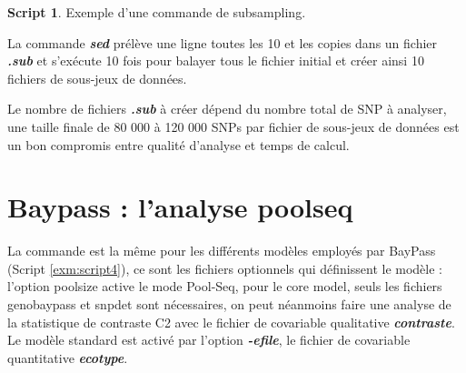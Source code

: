 \documentclass[
  openany]{book}
\newenvironment{Shaded}{\begin{snugshade}}{\end{snugshade}}
\newcommand{\AttributeTok}[1]{\textcolor[rgb]{0.13,0.29,0.53}{#1}}
\newcommand{\ControlFlowTok}[1]{\textcolor[rgb]{0.13,0.29,0.53}{\textbf{#1}}}
\newcommand{\DataTypeTok}[1]{\textcolor[rgb]{0.13,0.29,0.53}{#1}}
\newcommand{\DecValTok}[1]{\textcolor[rgb]{0.00,0.00,0.81}{#1}}
\newcommand{\FunctionTok}[1]{\textcolor[rgb]{0.13,0.29,0.53}{\textbf{#1}}}
\newcommand{\KeywordTok}[1]{\textcolor[rgb]{0.13,0.29,0.53}{\textbf{#1}}}
\newcommand{\NormalTok}[1]{#1}
\newcommand{\OperatorTok}[1]{\textcolor[rgb]{0.81,0.36,0.00}{\textbf{#1}}}
\newcommand{\StringTok}[1]{\textcolor[rgb]{0.31,0.60,0.02}{#1}}
\newcommand{\VariableTok}[1]{\textcolor[rgb]{0.00,0.00,0.00}{#1}}
\theoremstyle{definition}
\theoremstyle{definition}
\newtheorem{example}{Script}[chapter]
\theoremstyle{definition}
\theoremstyle{definition}
\theoremstyle{remark}
\begin{document}
\begin{example}
\protect\hypertarget{exm:script3}{}\label{exm:script3}{Exemple d'une commande de subsampling.}
\end{example}

La commande \textbf{\emph{sed}} prélève une ligne toutes les 10 et les copies dans un fichier \textbf{\emph{.sub}} et s'exécute 10 fois pour balayer tous le fichier initial et créer ainsi 10 fichiers de sous-jeux de données.

\begin{Shaded}
\end{Shaded}

Le nombre de fichiers \textbf{\emph{.sub}} à créer dépend du nombre total de SNP à analyser, une taille finale de 80 000 à 120 000 SNPs par fichier de sous-jeux de données est un bon compromis entre qualité d'analyse et temps de calcul.

\hypertarget{baypass-lanalyse-poolseq}{%
\chapter*{Baypass : l'analyse poolseq}\label{baypass-lanalyse-poolseq}}

La commande est la même pour les différents modèles employés par BayPass (Script \ref{exm:script4}), ce sont les fichiers optionnels qui définissent le modèle :
l'option poolsize active le mode Pool-Seq, pour le core model, seuls les fichiers genobaypass et snpdet sont nécessaires, on peut néanmoins faire une analyse de la statistique de contraste C2 avec le fichier de covariable qualitative \textbf{\emph{contraste}}.
Le modèle standard est activé par l'option \textbf{\emph{-efile}}, le fichier de covariable quantitative \textbf{\emph{ecotype}}.
\end{document}
